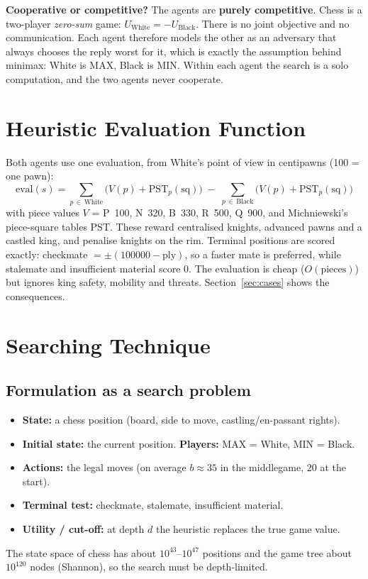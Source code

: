 \documentclass[11pt,a4paper]{article}
\begin{document}
\textbf{Cooperative or competitive?} The agents are \textbf{purely competitive}. Chess is a
two-player \emph{zero-sum} game: $U_{\text{White}}=-U_{\text{Black}}$. There is no joint objective and
no communication. Each agent therefore models the other as an adversary that always chooses the reply worst for
it, which is exactly the assumption behind minimax: White is MAX, Black is MIN.
Within each agent the search is a solo computation, and the two agents never cooperate.

\section{Heuristic Evaluation Function}\label{sec:eval}
Both agents use one evaluation, from White's point of view in centipawns (100 = one pawn):
\[
\mathrm{eval}(s)=\sum_{p\,\in\,\text{White}}\big(V(p)+\mathrm{PST}_p(\text{sq})\big)\;-\;\sum_{p\,\in\,\text{Black}}\big(V(p)+\mathrm{PST}_p(\text{sq})\big)
\]
with piece values $V$ = P~100, N~320, B~330, R~500, Q~900, and Michniewski's piece-square tables
$\mathrm{PST}$. These reward centralised knights, advanced pawns and a castled king, and penalise knights on the rim.
Terminal positions are scored exactly: checkmate $=\pm(100000-\text{ply})$, so a faster mate is preferred,
while stalemate and insufficient material score 0. The evaluation is cheap ($O(\text{pieces})$) but ignores king
safety, mobility and threats. Section~\ref{sec:cases} shows the consequences.

\section{Searching Technique}
\subsection{Formulation as a search problem}
\begin{itemize}
\item \textbf{State:} a chess position (board, side to move, castling/en-passant rights).
\item \textbf{Initial state:} the current position. \quad \textbf{Players:} MAX = White, MIN = Black.
\item \textbf{Actions:} the legal moves (on average $b\approx35$ in the middlegame, 20 at the start).
\item \textbf{Terminal test:} checkmate, stalemate, insufficient material.
\item \textbf{Utility / cut-off:} at depth $d$ the heuristic replaces the true game value.
\end{itemize}
The state space of chess has about $10^{43}$--$10^{47}$ positions and the game tree about $10^{120}$ nodes
(Shannon), so the search must be depth-limited.
\end{document}
